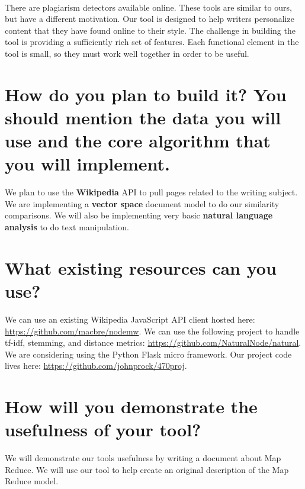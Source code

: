 \documentclass{article}
\begin{document}
\paragraph{}
There are plagiarism detectors available online. These tools are similar to ours, but have a different motivation. Our tool is designed to help writers
personalize content that they have found online to their style. The challenge in building the tool is providing a sufficiently rich set of features.
Each functional element in the tool is small, so they must work well together in order to be useful. 

\section{How do you plan to build it? You should mention the data you will use and the core algorithm that you will implement.}
We plan to use the \textbf{Wikipedia} API to pull pages related to the writing subject. We are implementing a \textbf{vector space} document
model to do our similarity comparisons. We will also be implementing very basic \textbf{natural language analysis} to do text manipulation.

\section{What existing resources can you use?}
We can use an existing Wikipedia JavaScript API client hosted here: \url{https://github.com/macbre/nodemw}. We can use 
the following project to handle tf-idf, stemming, and distance metrics: \url{https://github.com/NaturalNode/natural}. We 
are considering using the Python Flask micro framework. Our project code lives here: \url{https://github.com/johnprock/470proj}.

\section{How will you demonstrate the usefulness of your tool?}
We will demonstrate our tools usefulness by writing a document about Map Reduce. We will use our tool to help create an 
original description of the Map Reduce model.
\end{document}
